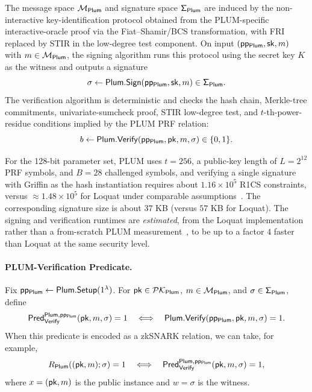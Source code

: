 The message space \(\mathsf{\mathcal{M}_{Plum}}\) and signature space \(\mathsf{\Sigma_{Plum}}\) are induced by the non-interactive key-identification protocol obtained from the PLUM-specific interactive-oracle proof via the Fiat–Shamir/BCS transformation, with FRI replaced by STIR in the low-degree test component. On input \((\mathsf{pp_{Plum}},\mathsf{sk},m)\) with \(m \in \mathsf{\mathcal{M}_{Plum}}\), the signing algorithm runs this protocol using the secret key \(K\) as the witness and outputs a signature
\begin{equation*}
  \sigma \leftarrow \mathsf{Plum}.\mathsf{Sign}(\mathsf{pp_{Plum}},\mathsf{sk},m) \in \mathsf{\Sigma_{Plum}}.
\end{equation*}
The verification algorithm is deterministic and checks the hash chain, Merkle-tree commitments, univariate-sumcheck proof, STIR low-degree test, and \(t\)-th-power-residue conditions implied by the PLUM PRF relation:
\begin{equation*}
  b \leftarrow \mathsf{Plum}.\mathsf{Verify}(\mathsf{pp_{Plum}},\mathsf{pk},m,\sigma) \in \{0,1\}.
\end{equation*}

For the 128-bit parameter set, PLUM uses \(t=256\), a public-key length of \(L=2^{12}\) PRF symbols, and \(B=28\) challenged symbols, and verifying a single signature with Griffin as the hash instantiation requires about \(1.16\times 10^5\) R1CS constraints, versus \(\approx 1.48\times 10^5\) for Loquat under comparable assumptions~\cite[\S4.2]{10.1007/978-981-95-2961-2_6}. The corresponding signature size is about \(37\) KB (versus \(57\) KB for Loquat). The signing and verification runtimes are \emph{estimated}, from the Loquat implementation rather than a from-scratch PLUM measurement~\cite[Table~2]{10.1007/978-981-95-2961-2_6}, to be up to a factor \(4\) faster than Loquat at the same security level.

\paragraph{PLUM-Verification Predicate.}
Fix \(\mathsf{pp_{Plum}}\leftarrow\mathsf{Plum}.\mathsf{Setup}(1^\lambda)\). For \(\mathsf{pk} \in \mathsf{\mathcal{PK}_{Plum}}\), \(m \in \mathsf{\mathcal{M}_{Plum}}\), and \(\sigma \in \mathsf{\Sigma_{Plum}}\), define
\begin{equation*}
  \mathsf{Pred}_{\mathsf{Verify}}^{\mathsf{Plum},\mathsf{pp_{Plum}}}(\mathsf{pk},m,\sigma)=1
  \quad\Longleftrightarrow\quad
  \mathsf{Plum}.\mathsf{Verify}(\mathsf{pp_{Plum}},\mathsf{pk},m,\sigma)=1.
\end{equation*}
When this predicate is encoded as a zkSNARK relation, we can take, for example,
\begin{equation*}
  R_{\mathsf{Plum}}((\mathsf{pk},m);\sigma)=1
  \quad\Longleftrightarrow\quad
  \mathsf{Pred}_{\mathsf{Verify}}^{\mathsf{Plum},\mathsf{pp_{Plum}}}(\mathsf{pk},m,\sigma)=1,
\end{equation*}
where \(x=(\mathsf{pk},m)\) is the public instance and \(w=\sigma\) is the witness.

